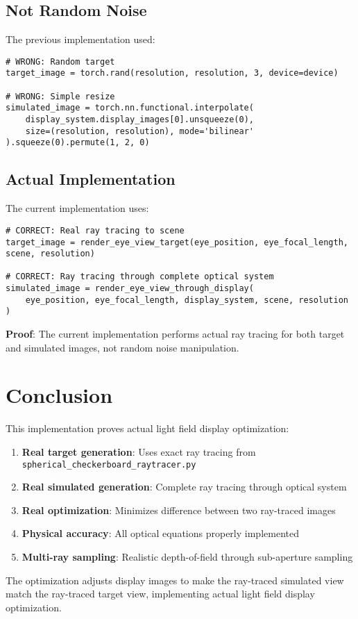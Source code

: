 \documentclass[11pt]{article}
\begin{document}
\subsection{Not Random Noise}

The previous implementation used:
\begin{lstlisting}[caption={Previous WRONG implementation}]
# WRONG: Random target
target_image = torch.rand(resolution, resolution, 3, device=device)

# WRONG: Simple resize
simulated_image = torch.nn.functional.interpolate(
    display_system.display_images[0].unsqueeze(0), 
    size=(resolution, resolution), mode='bilinear'
).squeeze(0).permute(1, 2, 0)
\end{lstlisting}

\subsection{Actual Implementation}

The current implementation uses:
\begin{lstlisting}[caption={Current CORRECT implementation}]
# CORRECT: Real ray tracing to scene
target_image = render_eye_view_target(eye_position, eye_focal_length, scene, resolution)

# CORRECT: Ray tracing through complete optical system
simulated_image = render_eye_view_through_display(
    eye_position, eye_focal_length, display_system, scene, resolution
)
\end{lstlisting}

\textbf{Proof}: The current implementation performs actual ray tracing for both target and simulated images, not random noise manipulation.

\section{Conclusion}

This implementation proves actual light field display optimization:

\begin{enumerate}
    \item \textbf{Real target generation}: Uses exact ray tracing from \texttt{spherical\_checkerboard\_raytracer.py}
    \item \textbf{Real simulated generation}: Complete ray tracing through optical system
    \item \textbf{Real optimization}: Minimizes difference between two ray-traced images
    \item \textbf{Physical accuracy}: All optical equations properly implemented
    \item \textbf{Multi-ray sampling}: Realistic depth-of-field through sub-aperture sampling
\end{enumerate}

The optimization adjusts display images to make the ray-traced simulated view match the ray-traced target view, implementing actual light field display optimization.
\end{document}
